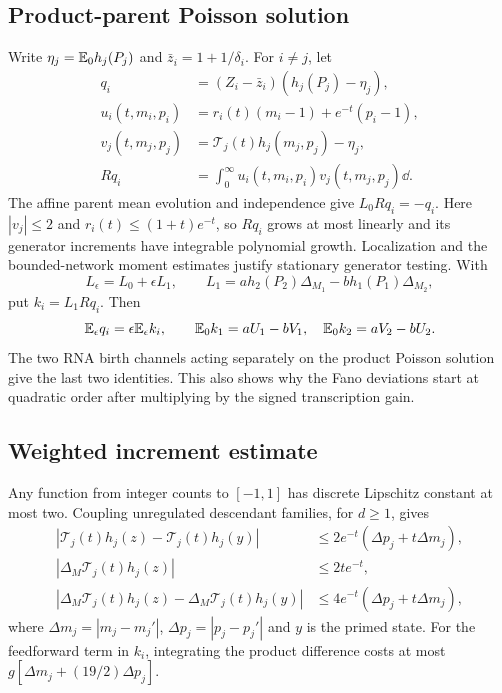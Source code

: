 \subsection{Product-parent Poisson solution}

Write $\eta_j=\mathbb E_0h_j(P_j)$ and $\bar z_i=1+1/\delta_i$.
For $i\ne j$, let
\begin{align}
 q_i&=(Z_i-\bar z_i)(h_j(P_j)-\eta_j),\nonumber\\
 u_i(t,m_i,p_i)&=r_i(t)(m_i-1)+e^{-t}(p_i-1),\nonumber\\
 v_j(t,m_j,p_j)&=\mathcal T_j(t)h_j(m_j,p_j)-\eta_j,\nonumber\\
 Rq_i&=\int_0^\infty u_i(t,m_i,p_i)v_j(t,m_j,p_j)\dd .
\end{align}
The affine parent mean evolution and independence give $L_0Rq_i=-q_i$.
Here $|v_j|\leq2$ and $r_i(t)\leq(1+t)e^{-t}$, so $Rq_i$ grows
at most linearly and its generator increments have integrable
polynomial growth. Localization and the bounded-network moment
estimates justify stationary generator testing. With
\begin{equation}
 L_\epsilon=L_0+\epsilon L_1,\qquad
 L_1=a h_2(P_2)\Delta_{M_1}-b h_1(P_1)\Delta_{M_2},
\end{equation}
put $k_i=L_1Rq_i$. Then
\begin{equation}
 \mathbb E_\epsilon q_i=\epsilon\mathbb E_\epsilon k_i,\qquad
 \mathbb E_0k_1=aU_1-bV_1,\quad
 \mathbb E_0k_2=aV_2-bU_2.
 \label{eq:poissonresponse}
\end{equation}
The two RNA birth channels acting separately on the product
Poisson solution give the last two identities. This also shows why
the Fano deviations start at quadratic order after multiplying
by the signed transcription gain.

\subsection{Weighted increment estimate}

Any function from integer counts to $[-1,1]$ has discrete Lipschitz
constant at most two. Coupling unregulated descendant families,
for $d\geq1$, gives
\begin{align}
 |\mathcal T_j(t)h_j(z)-\mathcal T_j(t)h_j(y)|
 &\leq2e^{-t}(\Delta p_j+t\Delta m_j),\nonumber\\
 |\Delta_M\mathcal T_j(t)h_j(z)|&\leq2te^{-t},\nonumber\\
 |\Delta_M\mathcal T_j(t)h_j(z)
        -\Delta_M\mathcal T_j(t)h_j(y)|
 &\leq4e^{-t}(\Delta p_j+t\Delta m_j),
\end{align}
where $\Delta m_j=|m_j-m_j'|$, $\Delta p_j=|p_j-p_j'|$
and $y$ is the primed state. For the feedforward term in $k_i$,
integrating the product difference costs at most
$g[\Delta m_j+(19/2)\Delta p_j]$.

